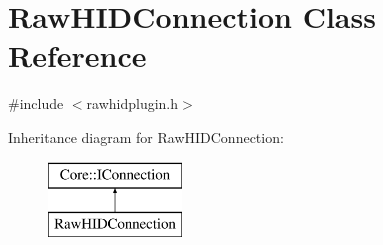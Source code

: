 \hypertarget{class_raw_h_i_d_connection}{\section{\-Raw\-H\-I\-D\-Connection \-Class \-Reference}
\label{class_raw_h_i_d_connection}
}


{\ttfamily \#include $<$rawhidplugin.\-h$>$}

\-Inheritance diagram for \-Raw\-H\-I\-D\-Connection\-:\begin{figure}[H]
\begin{center}
\leavevmode
\includegraphics[height=2.000000cm]{class_raw_h_i_d_connection}
\end{center}
\end{figure}
